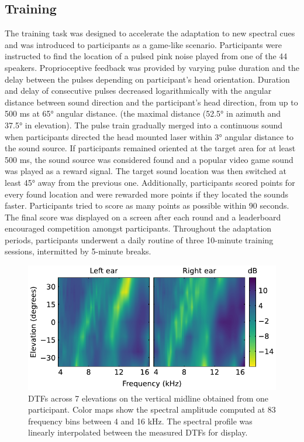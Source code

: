 \subsection{Training}
The training task was designed to accelerate the adaptation to new spectral cues and was introduced to participants as a game-like scenario. Participants were instructed to find the location of a pulsed pink noise played from one of the 44 speakers. Proprioceptive feedback was provided by varying pulse duration and the delay between the pulses depending on participant’s head orientation. Duration and delay of consecutive pulses decreased logarithmically with the angular distance between sound direction and the participant’s head direction, from up to 500 ms at 65° angular distance. (the maximal distance (52.5° in azimuth and 37.5° in elevation). The pulse train gradually merged into a continuous sound when participants directed the head mounted laser within 3° angular distance to the sound source. If participants remained oriented at the target area for at least 500 ms, the sound source was considered found and a popular video game sound was played as a reward signal. The target sound location was then switched at least 45° away from the previous one. Additionally, participants scored points for every found location and were rewarded more points if they located the sounds faster. Participants tried to score as many points as possible within 90 seconds. The final score was displayed on a screen after each round and a leaderboard encouraged competition amongst participants. Throughout the adaptation periods, participants underwent a daily routine of three 10-minute training sessions, intermitted by 5-minute breaks.

\begin{figure}
\centering
\includegraphics[width=12cm]{../Results/figures/fig1/fig1}
\caption{DTFs across 7 elevations on the vertical midline obtained from one participant. Color maps show the spectral amplitude computed at 83 frequency bins between 4 and 16 kHz. The spectral profile was linearly interpolated between the measured DTFs for display.}
\label{fig:ef_l_r}
\end{figure}

